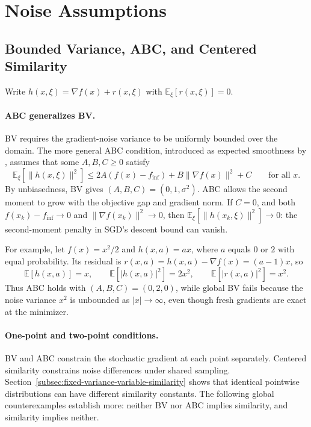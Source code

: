 \section{Noise Assumptions}
\label{app:noise-assumptions}

\subsection{Bounded Variance, ABC, and Centered Similarity}
\label{subsec:comparing-assumptions}

Write $h(x,\xi)=\nabla f(x)+r(x,\xi)$ with
$\mathbb E_\xi[r(x,\xi)]=0$.

\paragraph{ABC generalizes BV.}
BV requires the gradient-noise variance to be uniformly bounded over
the domain. The more general ABC condition, introduced as expected
smoothness by \citet{khaled2023better}, assumes that some
$A,B,C\geq0$ satisfy
\begin{equation}
\label{eq:abc-assumption}
\mathbb E_\xi[\|h(x,\xi)\|^2]
\leq2A(f(x)-f_{\inf})+B\|\nabla f(x)\|^2+C
\qquad\text{for all }x.
\end{equation}
By unbiasedness, BV gives $(A,B,C)=(0,1,\sigma^2)$.
ABC allows the second moment to grow with the objective gap and
gradient norm. If $C=0$, and both $f(x_k)-f_{\inf}\to0$ and
$\|\nabla f(x_k)\|^2\to0$, then
$\mathbb E_\xi[\|h(x_k,\xi)\|^2]\to0$: the second-moment penalty
in SGD's descent bound can vanish.

For example, let $f(x)=x^2/2$ and $h(x,a)=ax$, where $a$ equals
$0$ or $2$ with equal probability. Its residual is
$r(x,a)=h(x,a)-\nabla f(x)=(a-1)x$, so
\[
\mathbb E[h(x,a)]=x,\qquad
\mathbb E[|h(x,a)|^2]=2x^2,\qquad
\mathbb E[|r(x,a)|^2]=x^2.
\]
Thus ABC holds with $(A,B,C)=(0,2,0)$, while global BV fails
because the noise variance $x^2$ is unbounded as $|x|\to\infty$,
even though fresh gradients are exact at the minimizer.

\paragraph{One-point and two-point conditions.}
BV and ABC constrain the stochastic gradient at each point separately.
Centered similarity constrains noise differences under shared sampling.
Section~\ref{subsec:fixed-variance-variable-similarity} shows that
identical pointwise distributions can have different similarity
constants. The following global counterexamples establish more:
neither BV nor ABC implies similarity, and similarity implies neither.

